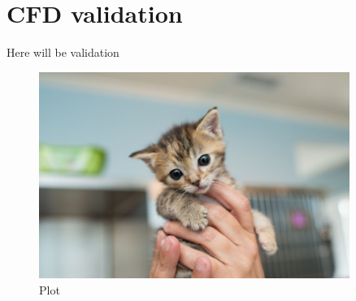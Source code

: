 
\chapter{CFD validation} %

\label{cfd_results} %

Here will be validation

\begin{figure}[ht]
    \centering
	\includegraphics[width=0.9\textwidth]{Pictures/kitten-placeholder.jpg}
    \caption{Plot} \label{dupa}
\end{figure}